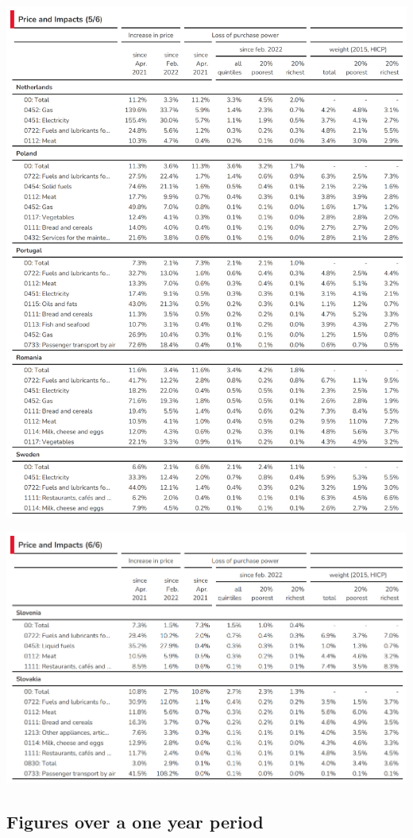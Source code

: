 \documentclass[
  9pt,
  a4paper,
  DIV=11,
  numbers=noendperiod,
  oneside]{scrartcl}
\begin{document}
\includegraphics[width=17cm,height=\textheight]{../svg/annex_5.png}

\includegraphics[width=17cm,height=\textheight]{../svg/annex_6.png}

\newpage

\hypertarget{figures-over-a-one-year-period}{%
\subsection{Figures over a one year
period}\label{figures-over-a-one-year-period}}
\end{document}
